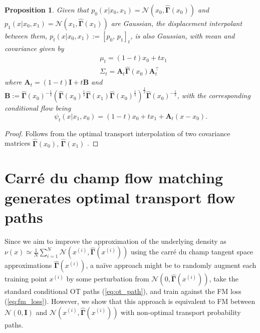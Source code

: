\documentclass{article} %
\newtheorem{proposition}{Proposition}
\newcommand{\N}{\mathcal{N}}
\newcommand{\I}{\mathbf{I}}
\newcommand{\G}{\widehat{\mathbf{\Gamma}}}
\begin{document}
\begin{proposition}\label{arbitrarymunu}
    Given that $p_0(x | x_0, x_1)=\N(x_0, \G(x_0))$ and $p_1(x|x_0, x_1)=\N(x_1, \G(x_1))$ are Gaussian, the displacement interpolant between them, $p_t(x | x_0, x_1) := [p_0,\,p_1]_t$, is also Gaussian, with mean and covariance given by 
    \begin{equation}
    \begin{aligned}
    &\mu_t = (1-t)x_0 + t x_1 \\
        &\Sigma_t = \mathbf{A}_t\G(x_0)\mathbf{A}_t^\top
    \end{aligned}
    \end{equation}
    where $\mathbf{A}_t = \left(1-t\right)\I + t\mathbf{B}$ and $\mathbf{B} := \G(x_0)^{-\frac{1}{2}}\left(\G(x_0)^{\frac{1}{2}} 
    \G(x_1)\G(x_0)^{\frac{1}{2}}\right)^{\frac{1}{2}}\G(x_0)^{-\frac{1}{2}}$, with the corresponding conditional flow being 
    \begin{equation}
        \psi_t(x| x_1, x_0) = (1-t)x_0 + tx_1 + \mathbf{A}_t\left(x - x_0\right).
    \end{equation}
\end{proposition}

\begin{proof}
    Follows from the optimal transport interpolation of two covariance matrices $\G(x_0),\,\G(x_1)$ \citep{bhatia2017bureswassersteindistancepositivedefinite}.
\end{proof}


\section{Carr\'{e} du champ flow matching generates optimal transport flow paths}\label{section:dataaugmentation}

Since we aim to improve the approximation of the underlying density as $\nu(x) \simeq \frac{1}{N}\sum_{i=1}^N \N(x^{(i)}, \G(x^{(i)}))$ using the carr\'{e} du champ tangent space approximations $\G(x^{(i)})$, a naïve approach might be to randomly augment each training point $x^{(i)}$ by some perturbation from $\N(0, \G(x^{(i)}))$, take the standard conditional OT paths (\ref{eq:ot_path}), and train against the FM loss (\ref{eq:fm_loss}).
However, we show that this approach is equivalent to FM between $\N(0, \I)$ and $\N(x^{(i)}, \G(x^{(i)}))$ with non-optimal transport probability paths.
\end{document}
